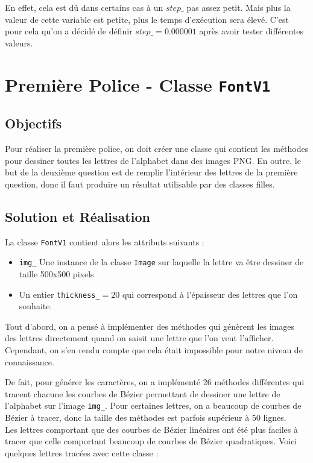 \documentclass[a4paper, 12pt]{article}
\begin{document}
En effet, cela est dû dans certains cas à un $step\_$ pas assez petit. Mais plus la valeur de cette variable est petite, plus le temps d’exécution sera élevé. C'est pour cela qu'on a décidé de définir $step\_ = 0.000001$ après avoir tester différentes valeurs.

\newpage
\section{Première Police - Classe \texttt{FontV1}}	
\subsection{Objectifs}
Pour réaliser la première police, on doit créer une classe qui contient les méthodes pour dessiner toutes les lettres de l'alphabet dans des images PNG. En outre, le but de la deuxième question est de remplir l'intérieur des lettres de la première question, donc il faut produire un résultat utilisable par des classes filles.

\subsection{Solution et Réalisation}
La classe \texttt{FontV1} contient alors les attributs suivants : 
\begin{itemize}
\item \texttt{img\_} Une instance de la classe \texttt{Image} sur laquelle la lettre va être dessiner de taille 500x500 pixels
\item Un entier \texttt{thickness\_}$= 20$ qui correspond à l'épaisseur des lettres que l'on souhaite. 
\end{itemize}
\vspace{0.5cm}

Tout d'abord, on a pensé à implémenter des méthodes qui génèrent les images des lettres directement quand on saisit une lettre que l'on veut l'afficher. Cependant, on s'en rendu compte que cela était impossible pour notre niveau de connaissance.

De fait, pour générer les caractères, on a implémenté 26 méthodes différentes qui tracent chacune les courbes de Bézier permettant de dessiner une lettre de l'alphabet sur l'image \texttt{img\_}. Pour certaines lettres, on a beaucoup de courbes de Bézier à tracer, donc la taille des méthodes est parfois supérieur à 50 lignes.\\

Les lettres comportant que des courbes de Bézier linéaires ont été plus faciles à tracer que celle comportant beaucoup de courbes de Bézier quadratiques. Voici quelques lettres tracées avec cette classe : 
\end{document}
